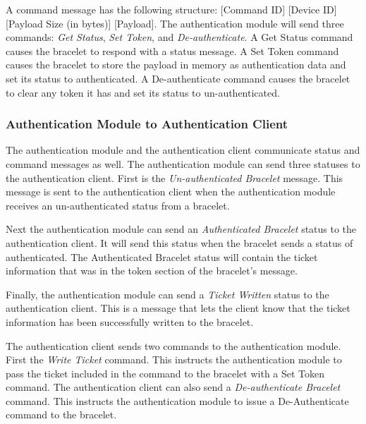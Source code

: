\documentclass[runningheads,a4paper]{llncs}
\begin{document}

A command message has the following structure: [Command ID] [Device ID] [Payload Size (in bytes)] [Payload]. The authentication module will send three commands: \emph{Get Status}, \emph{Set Token}, and \emph{De-authenticate}.  A Get Status command causes the bracelet to respond with a status message. A Set Token command causes the bracelet to store the payload in memory as authentication data and set its status to authenticated.  A De-authenticate command causes the bracelet to clear any token it has and set its status to un-authenticated.

\subsubsection{Authentication Module to Authentication Client}

The authentication module and the authentication client communicate status and command messages as well.  The authentication module can send three statuses to the authentication client.  First is the \emph{Un-authenticated Bracelet} message.  This message is sent to the authentication client when the authentication module receives an un-authenticated status from a bracelet.

Next the authentication module can send an \emph{Authenticated Bracelet} status to the authentication client.  It will send this status when the bracelet sends a status of authenticated.  The Authenticated Bracelet status will contain the ticket information that was in the token section of the bracelet's message.

Finally, the authentication module can send a \emph{Ticket Written} status to the authentication client.  This is a message that lets the client know that the ticket information has been successfully written to the bracelet.  

The authentication client sends two commands to the authentication module.  First the \emph{Write Ticket} command.  This instructs the authentication module to pass the ticket included in the command to the bracelet with a Set Token command.  The authentication client can also send a \emph{De-authenticate Bracelet} command.  This instructs the authentication module to issue a De-Authenticate command to the bracelet.
\end{document}
